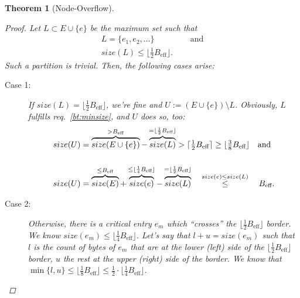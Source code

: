 \documentclass[a4paper, 9pt]{scrartcl}
\theoremstyle{plain}
\newtheorem{thm}{Theorem}[section]
\theoremstyle{definition}
\theoremstyle{remark}
\newcommand{\Beff}{ B_{\text{eff}} }
\begin{document}
\begin{multicols}{2}
\begin{thm}[Node-Overflow]
\begin{proof}
Let \mbox{$L \subset E \cup \{e\}$} be the {\em maximum set} such that
\begin{align*}
L = \{ e_1, e_2, \ldots \} & \quad \text{ and}\\
size(L) \leq \lfloor \tfrac{1}{2} \Beff \rfloor.
\end{align*}
Such a partition is trivial.
Then, the following cases arise:
\begin{description}
\item[Case 1:]
If \mbox{$size(L) = \lfloor \tfrac{1}{2} \Beff \rfloor$}, we're fine and
\mbox{$U := (E \cup \{e\}) \setminus L$}.
Obviously, $L$ fulfills req.~\ref{bt:minsize}, and $U$ does so, too:
\begin{align*}
size(U) & = \overbrace{size(E \cup \{e\})}^{> \Beff}
	- \overbrace{size(L)}^{= \lfloor \frac{1}{2} \Beff \rfloor}
	> \lceil \tfrac{1}{2} \Beff \rceil
	\geq \lfloor \tfrac{3}{8} \Beff \rfloor	\text{\quad and}\\
\\
size(U) & = \overbrace{size(E)}^{\leq \Beff}
	+ \overbrace{size(e)}^{\leq \lfloor \frac{1}{4} \Beff \rfloor}
	- \overbrace{size(L)}^{= \lfloor \frac{1}{2} \Beff \rfloor}
	\stackrel{\quad size(e) \leq size(L) \quad}{\leq} \Beff.
\end{align*}

\item[Case 2:]
Otherwise, there is a critical entry $e_m$ which ``crosses'' the
\mbox{$\lfloor \tfrac{1}{2} \Beff \rfloor$} border.
We know \mbox{$size(e_m) \leq \lfloor \tfrac{1}{4} \Beff \rfloor$}.
Let's say that \mbox{$l + u = size(e_m)$} such that $l$ is the count of bytes of
$e_m$ that are at the lower (left) side of the
\mbox{$\lfloor \tfrac{1}{2} \Beff \rfloor$} border, $u$ the rest at the upper
(right) side of the border.
We know that \mbox{$\min \{l, u\}
\leq \lfloor \tfrac{1}{8} \Beff \rfloor
\leq \tfrac{1}{2} \cdot \lfloor \tfrac{1}{4} \Beff \rfloor$}.


\end{description}
\end{proof}
\end{thm}
\end{multicols}
\end{document}
